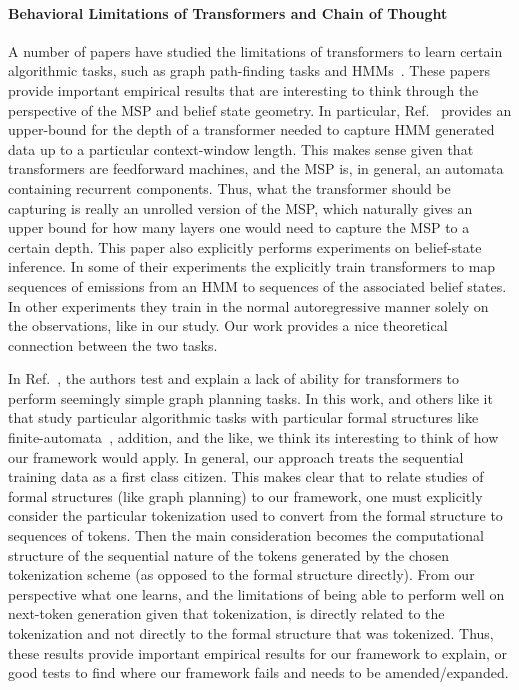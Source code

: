 \documentclass{article}
\begin{document}
\paragraph{Behavioral Limitations of Transformers and Chain of Thought}
A number of papers have studied the limitations of transformers to learn certain algorithmic tasks, such as graph path-finding tasks and HMMs~\cite{bachmann2024pitfalls, hu2024limitation}. These papers provide important empirical results that are interesting to think through the perspective of the MSP and belief state geometry. 
In particular, Ref.~\cite{hu2024limitation} provides an upper-bound for the depth of a transformer needed to capture HMM generated data up to a particular context-window length. This makes sense given that transformers are feedforward machines, and the MSP is, in general, an automata containing recurrent components. Thus, what the transformer should be capturing is really an unrolled version of the MSP, which naturally gives an upper bound for how many layers one would need to capture the MSP to a certain depth. This paper also explicitly performs experiments on belief-state inference. In some of their experiments the explicitly train transformers to map sequences of emissions from an HMM to sequences of the associated belief states. In other experiments they train in the normal autoregressive manner solely on the observations, like in our study. Our work provides a nice theoretical connection between the two tasks.

In Ref.~\citep{bachmann2024pitfalls}, the authors test and explain a lack of ability for transformers to perform seemingly simple graph planning tasks. In this work, and others like it that study particular algorithmic tasks with particular formal structures like finite-automata~\cite{liu2022transformers}, addition, and the like, we think its interesting to think of how our framework would apply. In general, our approach treats the sequential training data as a first class citizen. This makes clear that to relate studies of formal structures (like graph planning) to our framework, one must explicitly consider the particular tokenization used to convert from the formal structure to sequences of tokens. Then the main consideration becomes the computational structure of the sequential nature of the tokens generated by the chosen tokenization scheme (as opposed to the formal structure directly). From our perspective what one learns, and the limitations of being able to perform well on next-token generation given that tokenization, is directly related to the tokenization and not directly to the formal structure that was tokenized. Thus, these results provide important empirical results for our framework to explain, or good tests to find where our framework fails and needs to be amended/expanded.
\end{document}

